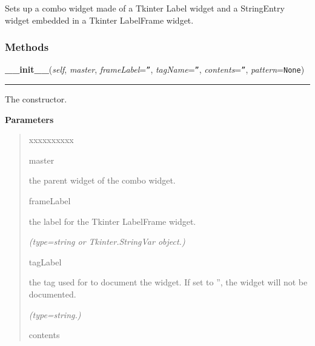 Sets up a combo widget made of a Tkinter Label widget and a StringEntry 
widget embedded in a Tkinter LabelFrame widget.



  \subsubsection{Methods}

    \vspace{0.5ex}

\hspace{.8\funcindent}\begin{boxedminipage}{\funcwidth}

    \raggedright \textbf{\_\_init\_\_}(\textit{self}, \textit{master}, \textit{frameLabel}={\tt ''}, \textit{tagName}={\tt ''}, \textit{contents}={\tt ''}, \textit{pattern}={\tt None})

    \vspace{-1.5ex}

    \rule{\textwidth}{0.5\fboxrule}
\setlength{\parskip}{2ex}
    The constructor.

\setlength{\parskip}{1ex}
      \textbf{Parameters}
      \vspace{-1ex}

      \begin{quote}
        \begin{Ventry}{xxxxxxxxxx}

          \item[master]

          the parent widget of the combo widget.

          \item[frameLabel]

          the label for the Tkinter LabelFrame widget.

            {\it (type=string or Tkinter.StringVar object.)}

          \item[tagLabel]

          the tag used for to document the widget. If set to '', the widget
          will not be documented.

            {\it (type=string.)}

          \item[contents]


\end{Ventry}
\end{quote}
\end{boxedminipage}
